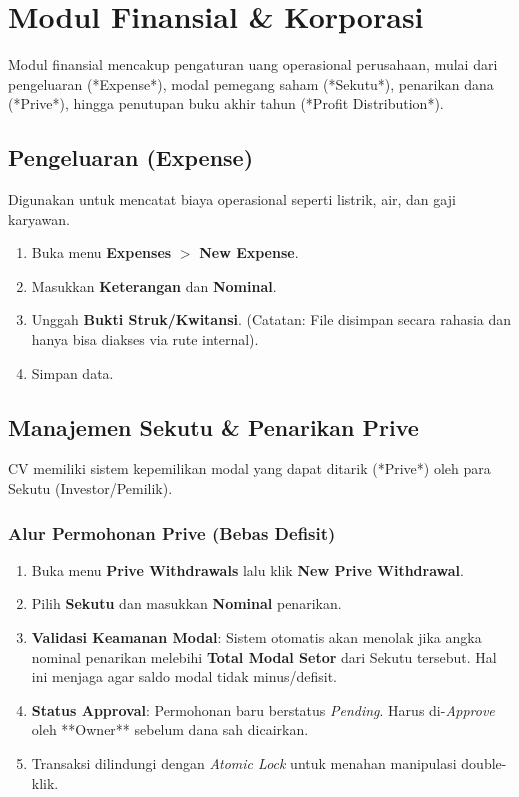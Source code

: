 \chapter{Modul Finansial \& Korporasi}

Modul finansial mencakup pengaturan uang operasional perusahaan, mulai dari pengeluaran (*Expense*), modal pemegang saham (*Sekutu*), penarikan dana (*Prive*), hingga penutupan buku akhir tahun (*Profit Distribution*).

\section{Pengeluaran (Expense)}
Digunakan untuk mencatat biaya operasional seperti listrik, air, dan gaji karyawan.
\begin{enumerate}
    \item Buka menu \textbf{Expenses} $>$ \textbf{New Expense}.
    \item Masukkan \textbf{Keterangan} dan \textbf{Nominal}.
    \item Unggah \textbf{Bukti Struk/Kwitansi}. (Catatan: File disimpan secara rahasia dan hanya bisa diakses via rute internal).
    \item Simpan data.
\end{enumerate}

\section{Manajemen Sekutu \& Penarikan Prive}
CV memiliki sistem kepemilikan modal yang dapat ditarik (*Prive*) oleh para Sekutu (Investor/Pemilik).

\subsection{Alur Permohonan Prive (Bebas Defisit)}
\begin{enumerate}
    \item Buka menu \textbf{Prive Withdrawals} lalu klik \textbf{New Prive Withdrawal}.
    \item Pilih \textbf{Sekutu} dan masukkan \textbf{Nominal} penarikan.
    \item \textbf{Validasi Keamanan Modal}: Sistem otomatis akan menolak jika angka nominal penarikan melebihi \textbf{Total Modal Setor} dari Sekutu tersebut. Hal ini menjaga agar saldo modal tidak minus/defisit.
    \item \textbf{Status Approval}: Permohonan baru berstatus \textit{Pending}. Harus di-\textit{Approve} oleh **Owner** sebelum dana sah dicairkan.
    \item Transaksi dilindungi dengan \textit{Atomic Lock} untuk menahan manipulasi double-klik.
\end{enumerate}

